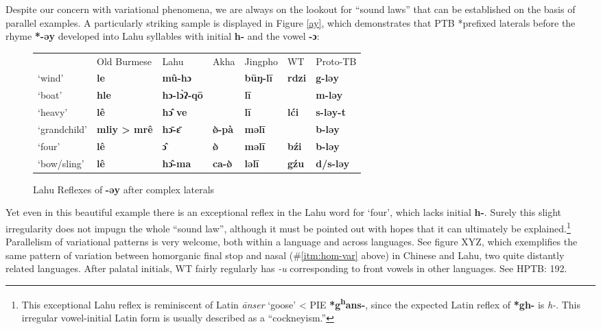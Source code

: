Despite our concern with variational phenomena, we are always on the lookout for “sound laws” that can be established on the basis of parallel examples. A particularly striking sample is displayed in Figure \ref{ay}, which demonstrates that PTB *prefixed laterals before the rhyme \textbf{*-əy} developed into Lahu syllables with initial \textbf{h-} and the vowel \textbf{-ɔ}:

\begin{figure}
\caption{Lahu Reflexes of \textbf{-əy} after complex laterals}
\begin{tabular}{l l l l l l l}
 & Old Burmese & Lahu & Akha & Jingpho & WT & Proto-TB\\
‘wind’ & \textbf{le} & \textbf{mû-hɔ} & \textbf{} & \textbf{būŋ-lī} & \textbf{rdzi} & \textbf{g-ləy}\\
‘boat’ & \textbf{hle} & \textbf{hɔ-lɔ̀ʔ-qō} & \textbf{} & \textbf{lī} & \textbf{} & \textbf{m-ləy}\\
‘heavy’ & \textbf{lê} & \textbf{hɔ̂ ve} & \textbf{} & \textbf{lī} & \textbf{lći} & \textbf{s-ləy-t}\\
‘grandchild’ & \textbf{mliy > mrê} & \textbf{hɔ̄-ɛ̄} & \textbf{ø̀-pà} & \textbf{məlī} & \textbf{} & \textbf{b-ləy}\\
‘four’ & \textbf{lê} & \textbf{ɔ̂} & \textbf{ø̀} & \textbf{məlī} & \textbf{bźi} & \textbf{b-ləy}\\
‘bow/sling’ & \textbf{lê} & \textbf{hɔ̂-ma} & \textbf{ca-ø̀} & \textbf{ləlī} & \textbf{gźu} & \textbf{d/s-ləy}\\
\end{tabular}
\end{figure}

Yet even in this beautiful example there is an exceptional reflex in the Lahu word for ‘four’, which lacks initial \textbf{h-}. Surely this slight irregularity does not impugn the whole “sound law”, although it must be pointed out with hopes that it can ultimately be explained.\footnote{This exceptional Lahu reflex is reminiscent of Latin \textit{\=anser} ‘goose’ < PIE \textbf{*g\textsuperscript{h}ans-}, since the expected Latin reflex of \textbf{*gh-} is \textit{h-}. This irregular vowel-initial Latin form is usually described as a “cockneyism.”} Parallelism of variational patterns is very welcome, both within a language and across languages. See figure XYZ, which exemplifies the same pattern of variation between homorganic final stop and nasal (\#\ref{itm:hom-var} above) in Chinese and Lahu, two quite distantly related languages. After palatal initials, WT fairly regularly has \textit{-u} corresponding to front vowels in other languages. See HPTB: 192.


